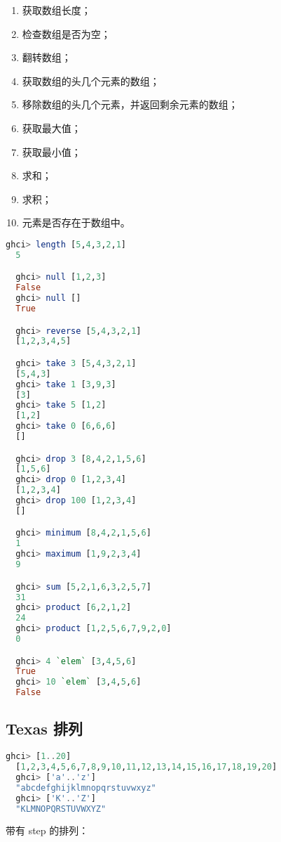\documentclass[./main.tex]{subfiles}
\begin{document}
\begin{enumerate}
  \item {} 获取数组长度；
  \item {} 检查数组是否为空；
  \item {} 翻转数组；
  \item {} 获取数组的头几个元素的数组；
  \item {} 移除数组的头几个元素，并返回剩余元素的数组；
  \item {} 获取最大值；
  \item {} 获取最小值；
  \item {} 求和；
  \item {} 求积；
  \item {} 元素是否存在于数组中。
\end{enumerate}

\begin{lstlisting}[language=Haskell]
  ghci> length [5,4,3,2,1]
  5

  ghci> null [1,2,3]
  False
  ghci> null []
  True

  ghci> reverse [5,4,3,2,1]
  [1,2,3,4,5]

  ghci> take 3 [5,4,3,2,1]
  [5,4,3]
  ghci> take 1 [3,9,3]
  [3]
  ghci> take 5 [1,2]
  [1,2]
  ghci> take 0 [6,6,6]
  []

  ghci> drop 3 [8,4,2,1,5,6]
  [1,5,6]
  ghci> drop 0 [1,2,3,4]
  [1,2,3,4]
  ghci> drop 100 [1,2,3,4]
  []

  ghci> minimum [8,4,2,1,5,6]
  1
  ghci> maximum [1,9,2,3,4]
  9

  ghci> sum [5,2,1,6,3,2,5,7]
  31
  ghci> product [6,2,1,2]
  24
  ghci> product [1,2,5,6,7,9,2,0]
  0

  ghci> 4 `elem` [3,4,5,6]
  True
  ghci> 10 `elem` [3,4,5,6]
  False
\end{lstlisting}

\subsection*{Texas 排列}

\begin{lstlisting}[language=Haskell]
  ghci> [1..20]
  [1,2,3,4,5,6,7,8,9,10,11,12,13,14,15,16,17,18,19,20]
  ghci> ['a'..'z']
  "abcdefghijklmnopqrstuvwxyz"
  ghci> ['K'..'Z']
  "KLMNOPQRSTUVWXYZ"
\end{lstlisting}

带有 step 的排列：
\end{document}
